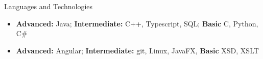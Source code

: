 \documentclass[]{mcdowellcv}
\begin{document}
	\begin{cvsection}{Languages and Technologies}
		\begin{cvsubsection}{}{}{}	
			\begin{itemize}
				\item \textbf{Advanced:} Java; \textbf{Intermediate:} C++, Typescript, SQL; \textbf{Basic} C, Python, C\# 
				\item \textbf{Advanced:} Angular; \textbf{Intermediate:} git, Linux, JavaFX, \textbf{Basic} XSD, XSLT
			\end{itemize}
		\end{cvsubsection}
	\end{cvsection}
	
\end{document}

